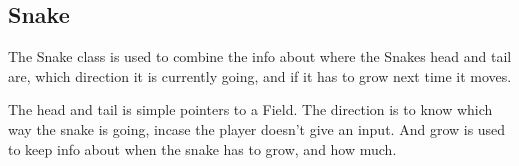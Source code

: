 \subsection{Snake}

The Snake class is used to combine the info about where the Snakes head and tail are, which direction it is currently going, and if it has to grow next time it moves.

The head and tail is simple pointers to a Field. The direction is to know which way the snake is going, incase the player doesn't give an input. And grow is used to keep info about when the snake has to grow, and how much.
